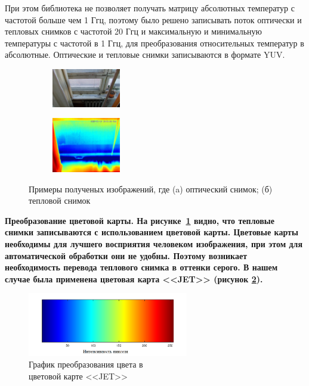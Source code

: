 \documentclass[t]{beamer}
\begin{document}
	\begin{frame}
		При этом библиотека не позволяет получать матрицу абсолютных температур с частотой больше чем 1 Ггц, поэтому было решено записывать поток оптически и тепловых снимков с частотой 20 Ггц и максимальную и минимальную температуры с частотой в 1 Ггц, для преобразования относительных температур в абсолютные. Оптические и тепловые снимки записываются в формате YUV.
		\begin{figure}[ht!]
			\begin{subfigure}{.45\textwidth}
				\centering
				\includegraphics[width = 3cm]{image/chapter_2/opt_example}
				\caption{}
			\end{subfigure}
			\begin{subfigure}{.45\textwidth}
				\centering
				\includegraphics[width = 3cm]{image/chapter_2/tep_example}
				\caption{}
			\end{subfigure}
			\centering
			\caption{Примеры полученых изображений, где (a) оптический снимок; (б) тепловой снимок}
			\label{fig:Examples}
		\end{figure}
	\end{frame}

	\begin{frame}
		\bfseries Преобразование цветовой карты. \normalfont
		На рисунке~\ref{fig:Examples} видно, что тепловые снимки записываются с использованием цветовой карты. Цветовые карты необходимы для лучшего восприятия человеком изображения, при этом для автоматической обработки они не удобны. Поэтому возникает необходимость перевода теплового снимка в оттенки серого. В нашем случае была применена цветовая карта <<JET>> (рисунок \ref{fig:jet}).
		\begin{figure}[ht!]
			\centering
			\includegraphics[width = 7cm]{image/chapter_2/jet}	
			\caption{График преобразования цвета в\\цветовой карте <<JET>>}
			\label{fig:jet}
		\end{figure}
	\end{frame}
\end{document}
